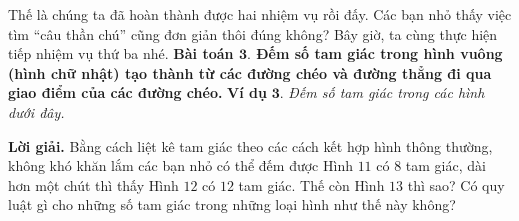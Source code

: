 	Thế là chúng ta đã hoàn thành được hai nhiệm vụ rồi đấy. Các bạn nhỏ thấy việc tìm “câu thần chú” cũng đơn giản thôi đúng không? Bây giờ, ta cùng thực hiện tiếp nhiệm vụ thứ ba nhé.
	\vskip 0.1cm
	\textbf{\color{toancuabi}Bài toán $\pmb{3.}$ Đếm số tam giác trong hình vuông (hình chữ nhật) tạo thành từ các đường chéo và đường thẳng đi qua giao điểm của các đường chéo.}
	\vskip 0.1cm
	\textbf{\color{toancuabi}Ví dụ} $\pmb{3.}$ \textit{Đếm số tam giác trong các hình dưới đây.}
	\begin{figure}[H]
		\centering
		\vspace*{-5pt}
		\captionsetup{labelformat= empty, justification=centering}
		\captionsetup[subfigure]{labelformat=empty}
		\hfill{}
		\hfill
		\hfill
		\hfill
		\hfill
		\vspace*{-10pt}
	\end{figure} 
	\textbf{\color{toancuabi}Lời giải.}
	\vskip 0.1cm
	Bằng cách liệt kê tam giác theo các cách kết hợp hình thông thường, không khó khăn lắm các bạn nhỏ có thể đếm được Hình $11$ có $8$ tam giác, dài hơn một chút thì thấy Hình $12$ có $12$ tam giác. Thế còn Hình $13$ thì sao? Có quy luật gì cho những số tam giác trong những loại hình như thế này không?
	\vskip 0.1cm
